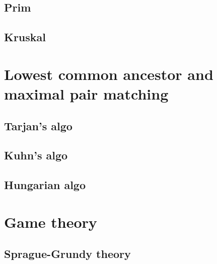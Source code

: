 \documentclass[12pt,a4paper]{article}
\begin{document}


\subsection{Prim}



\subsection{Kruskal}



\section{Lowest common ancestor and maximal pair matching}

\subsection{Tarjan's algo}



\subsection{Kuhn's algo}



\subsection{Hungarian algo}



\section{Game theory}

\subsection{Sprague-Grundy theory}
\end{document}
